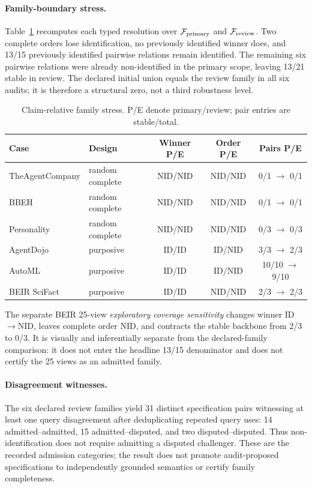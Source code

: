 \paragraph{Family-boundary stress.}
Table~\ref{tab:microexp-family-stress} recomputes each typed resolution over \(\mathcal F_{\mathrm{primary}}\) and \(\mathcal F_{\mathrm{review}}\).  Two complete orders lose identification, no previously identified winner does, and 13/15 previously identified pairwise relations remain identified.  The remaining six pairwise relations were already non-identified in the primary scope, leaving 13/21 stable in review.  The declared initial union equals the review family in all six audits; it is therefore a structural zero, not a third robustness level.

\begin{table}[ht]
\centering
\caption{Claim-relative family stress. P/E denote primary/review; pair entries are stable/total.}
\label{tab:microexp-family-stress}
\footnotesize
\setlength{\tabcolsep}{3pt}
\begin{tabularx}{\linewidth}{@{}p{.22\linewidth}p{.18\linewidth}ccc@{}}
\toprule Case & Design & Winner P/E & Order P/E & Pairs P/E \\
\midrule
TheAgentCompany & random complete & NID/NID & NID/NID & 0/1 $\to$ 0/1 \\
BBEH & random complete & NID/NID & NID/NID & 0/1 $\to$ 0/1 \\
Personality & random complete & NID/NID & NID/NID & 0/3 $\to$ 0/3 \\
AgentDojo & purposive & ID/ID & ID/NID & 3/3 $\to$ 2/3 \\
AutoML & purposive & ID/ID & ID/NID & 10/10 $\to$ 9/10 \\
BEIR SciFact & purposive & ID/ID & NID/NID & 2/3 $\to$ 2/3 \\
\bottomrule
\end{tabularx}
\end{table}

The separate BEIR 25-view \emph{exploratory coverage sensitivity} changes winner ID\(\to\)NID, leaves complete order NID, and contracts the stable backbone from 2/3 to 0/3.  It is visually and inferentially separate from the declared-family comparison: it does not enter the headline 13/15 denominator and does not certify the 25 views as an admitted family.

\paragraph{Disagreement witnesses.}
The six declared review families yield 31 distinct specification pairs witnessing at least one query disagreement after deduplicating repeated query uses: 14 admitted--admitted, 15 admitted--disputed, and two disputed--disputed.  Thus non-identification does not require admitting a disputed challenger.  These are the recorded admission categories; the result does not promote audit-proposed specifications to independently grounded semantics or certify family completeness.

